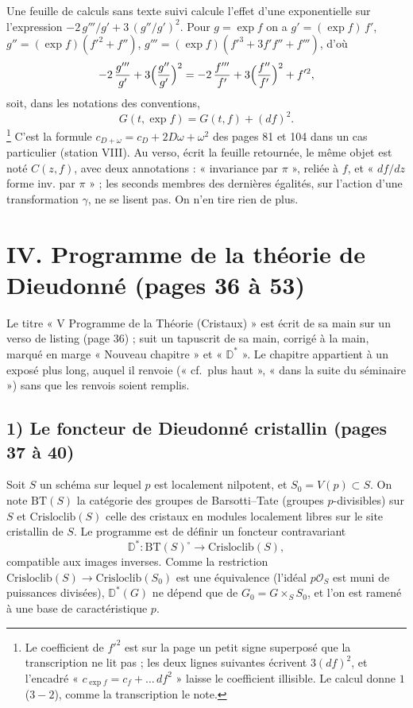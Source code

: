\documentclass[11pt,a4paper]{article}
\begin{document}
Une feuille de calculs sans texte suivi calcule l'effet d'une exponentielle
sur l'expression $-2\,g'''/g' + 3\,(g''/g')^2$. Pour $g = \exp f$ on a
$g' = (\exp f)\,f'$, $g'' = (\exp f)(f'^2 + f'')$,
$g''' = (\exp f)(f'^3 + 3f'f'' + f''')$, d'où
\[
  -2\,\frac{g'''}{g'} + 3\Bigl(\frac{g''}{g'}\Bigr)^2
  = -2\,\frac{f'''}{f'} + 3\Bigl(\frac{f''}{f'}\Bigr)^2 + f'^2 ,
\]
soit, dans les notations des conventions,
\[
  G(t, \exp f) = G(t, f) + (df)^2 .
\]
\footnote{Le coefficient de $f'^2$ est sur la page un petit signe superposé
que la transcription ne lit pas ; les deux lignes suivantes écrivent
$3(df)^2$, et l'encadré « $c_{\exp f} = c_f + \ldots\, df^2$ » laisse le
coefficient illisible. Le calcul donne $1$ ($3 - 2$), comme la transcription
le note.} C'est la formule $c_{D + \omega} = c_D + 2D\omega + \omega^2$ des
pages 81 et 104 dans un cas particulier (station VIII). Au verso, écrit la
feuille retournée, le même objet est noté $C(z,f)$, avec deux annotations :
« invariance par $\pi$ », reliée à $f$, et « $df/dz$ forme inv. par $\pi$ » ;
les seconds membres des dernières égalités, sur l'action d'une transformation
$\gamma$, ne se lisent pas. On n'en tire rien de plus.

\section*{IV. Programme de la théorie de Dieudonné (pages 36 à 53)}

Le titre « V Programme de la Théorie (Cristaux) » est écrit de sa main sur un
verso de listing (page 36) ; suit un tapuscrit de sa main, corrigé à la
main, marqué en marge « Nouveau chapitre » et « $\mathbb{D}^*$ ». Le chapitre
appartient à un exposé plus long, auquel il renvoie (« cf.\ plus haut »,
« dans la suite du séminaire ») sans que les renvois soient remplis.

\subsection*{1) Le foncteur de Dieudonné cristallin (pages 37 à 40)}

Soit $S$ un schéma sur lequel $p$ est localement nilpotent, et
$S_0 = V(p) \subset S$. On note $\mathrm{BT}(S)$ la catégorie des groupes de
Barsotti--Tate (groupes $p$-divisibles) sur $S$ et $\mathrm{Crisloclib}(S)$
celle des cristaux en modules localement libres sur le site cristallin de
$S$. Le programme est de définir un foncteur contravariant
\[
  \mathbb{D}^* : \mathrm{BT}(S)^{\circ} \longrightarrow \mathrm{Crisloclib}(S),
\]
compatible aux images inverses. Comme la restriction
$\mathrm{Crisloclib}(S) \to \mathrm{Crisloclib}(S_0)$ est une équivalence (l'idéal
$p\mathcal{O}_S$ est muni de puissances divisées), $\mathbb{D}^*(G)$ ne dépend
que de $G_0 = G \times_S S_0$, et l'on est ramené à une base de
caractéristique $p$.
\end{document}
